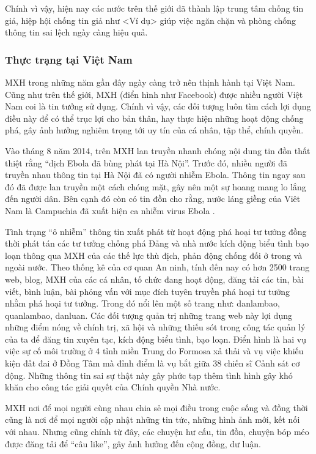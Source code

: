		Chính vì vậy, hiện nay các nước trên thế giới đã thành lập trung tâm chống tin giả, hiệp hội chống tin giả như <Ví dụ> giúp việc ngăn chặn và phòng chống thông tin sai lệch ngày càng hiệu quả.
		\subsubsection{Thực trạng tại Việt Nam}
		MXH trong những năm gần đây ngày càng trở nên thịnh hành tại Việt Nam. Cũng như trên thế giới, MXH (điển hình như Facebook) được nhiều người Việt Nam coi là tin tưởng sử dụng. Chính vì vậy, các đối tượng luôn tìm cách lợi dụng điều này để có thể trục lợi cho bản thân, hay thực hiện những hoạt động chống phá, gây ảnh hưởng nghiêm trọng tới uy tín của cá nhân, tập thể, chính quyền.
		
		Vào tháng 8 năm 2014, trên MXH lan truyền nhanh chóng nội dung tin đồn thất thiệt rằng “dịch Ebola đã bùng phát tại Hà Nội”. Trước đó, nhiều người đã truyền nhau thông tin tại Hà Nội đã có người nhiễm Ebola. Thông tin ngay sau đó đã được lan truyền một cách chóng mặt, gây nên một sự hoang mang lo lắng đến người dân. Bên cạnh đó còn có tin đồn cho rằng, nước láng giềng của Viêt Nam là Campuchia đã xuất hiện ca nhiễm virus Ebola \cite{ebola}.
		
		Tình trạng “ô nhiễm” thông tin xuất phát từ hoạt động phá hoại tư tưởng đồng thời phát tán các tư tưởng chống phá Đảng và nhà nước kích động biểu tình bạo loạn thông qua MXH của các thế lực thù địch, phản động chống đối ở trong và ngoài nước. Theo thống kê của cơ quan An ninh, tính đến nay có hơn 2500 trang web, blog, MXH của các cá nhân, tố chức đang hoạt động, đăng tải các tin, bài viết, bình luận, bài phỏng vấn với mục đích tuyên truyền phá hoại tư tưởng nhằm phá hoại tư tưởng. Trong đó nổi lên một số trang như: danlambao, quanlambao, danluan. Các đối tượng quản trị những trang web này lợi dụng những điểm nóng về chính trị, xã hội và những thiếu sót trong công tác quản lý của ta để đăng tin xuyên tạc, kích động biểu tình, bạo loạn. Điển hình là hai vụ việc sự cố môi trường ở 4 tỉnh miền Trung do Formosa xả thải \cite{formusa} và vụ việc khiếu kiện đất đai ở Đồng Tâm mà đỉnh điểm là vụ bắt giữa 38 chiến sĩ Cảnh sát cơ động. Những thông tin sai sự thật này gây phức tạp thêm tình hình gây khó khăn cho công tác giải quyết của Chính quyền Nhà nước.
		
		MXH nơi để mọi người cùng nhau chia sẻ mọi điều trong cuộc sống và đồng thời cũng là nơi để mọi người cập nhật những tin tức, những hình ảnh mới, kết nối với nhau. Nhưng cũng chính từ đây, các chuyện hư cấu, tin đồn, chuyện bóp méo được đăng tải để “câu like”, gây ảnh hưởng đến cộng đồng, dư luận.
		
